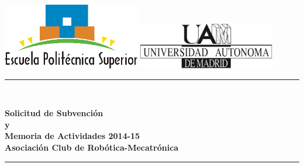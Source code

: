 \documentclass[12pt,twoside]{report}
\date{Diciembre de 2015}
\newcommand{\reporttitle}{
	Solicitud de Subvención\\
	y \\
	Memoria de Actividades 2014-15
}
\newcommand{\reportauthor}{Asociación Club de Robótica-Mecatrónica}
\begin{document}
\begin{titlepage}

\newcommand{\HRule}{\rule{\linewidth}{1mm}} %



\includegraphics[width = 6cm]{fotos/logo-eps.png}
\hfill
\includegraphics[width = 6cm]{fotos/logo-uam.png}



\center %


\vspace{1cm}



\HRule \\[0.4cm]
\begin{spacing}{1.5}
{ \fontsize{0.8cm}{1em} \bfseries \reporttitle}\\ %
\vspace{0.5cm}
{ \fontsize{0.7cm}{1em} \bfseries \reportauthor} \\
\end{spacing}
\HRule \\[1.5cm]



\end{titlepage}
\end{document}
